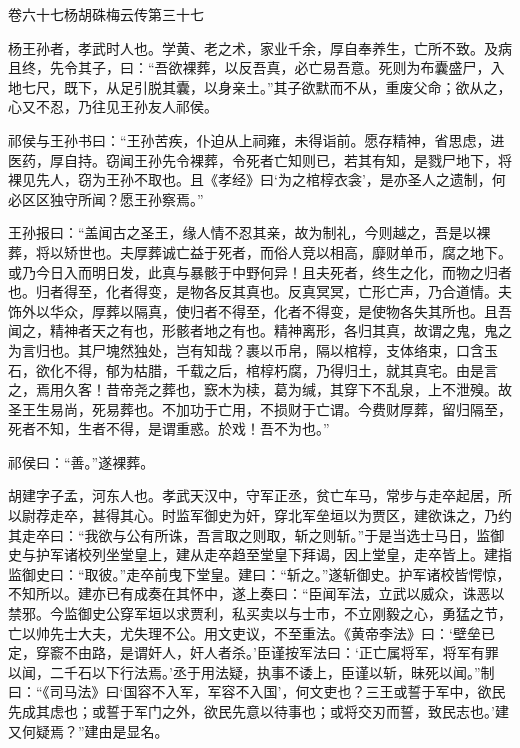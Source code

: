 \documentclass[12pt,UTF8]{ctexbook}
\begin{document}
卷六十七杨胡硃梅云传第三十七



杨王孙者，孝武时人也。学黄、老之术，家业千余，厚自奉养生，亡所不致。及病且终，先令其子，曰：“吾欲裸葬，以反吾真，必亡易吾意。死则为布囊盛尸，入地七尺，既下，从足引脱其囊，以身亲土。”其子欲默而不从，重废父命；欲从之，心又不忍，乃往见王孙友人祁侯。



祁侯与王孙书曰：“王孙苦疾，仆迫从上祠雍，未得诣前。愿存精神，省思虑，进医药，厚自持。窃闻王孙先令裸葬，令死者亡知则已，若其有知，是戮尸地下，将裸见先人，窃为王孙不取也。且《孝经》曰‘为之棺椁衣衾’，是亦圣人之遗制，何必区区独守所闻？愿王孙察焉。”



王孙报曰：“盖闻古之圣王，缘人情不忍其亲，故为制礼，今则越之，吾是以裸葬，将以矫世也。夫厚葬诚亡益于死者，而俗人竞以相高，靡财单币，腐之地下。或乃今日入而明日发，此真与暴骸于中野何异！且夫死者，终生之化，而物之归者也。归者得至，化者得变，是物各反其真也。反真冥冥，亡形亡声，乃合道情。夫饰外以华众，厚葬以隔真，使归者不得至，化者不得变，是使物各失其所也。且吾闻之，精神者天之有也，形骸者地之有也。精神离形，各归其真，故谓之鬼，鬼之为言归也。其尸塊然独处，岂有知哉？裹以币帛，隔以棺椁，支体络束，口含玉石，欲化不得，郁为枯腊，千载之后，棺椁朽腐，乃得归土，就其真宅。由是言之，焉用久客！昔帝尧之葬也，窾木为椟，葛为缄，其穿下不乱泉，上不泄殠。故圣王生易尚，死易葬也。不加功于亡用，不损财于亡谓。今费财厚葬，留归隔至，死者不知，生者不得，是谓重惑。於戏！吾不为也。”



祁侯曰：“善。”遂裸葬。



胡建字子孟，河东人也。孝武天汉中，守军正丞，贫亡车马，常步与走卒起居，所以尉荐走卒，甚得其心。时监军御史为奸，穿北军垒垣以为贾区，建欲诛之，乃约其走卒曰：“我欲与公有所诛，吾言取之则取，斩之则斩。”于是当选士马日，监御史与护军诸校列坐堂皇上，建从走卒趋至堂皇下拜谒，因上堂皇，走卒皆上。建指监御史曰：“取彼。”走卒前曳下堂皇。建曰：“斩之。”遂斩御史。护军诸校皆愕惊，不知所以。建亦已有成奏在其怀中，遂上奏曰：“臣闻军法，立武以威众，诛恶以禁邪。今监御史公穿军垣以求贾利，私买卖以与士市，不立刚毅之心，勇猛之节，亡以帅先士大夫，尤失理不公。用文吏议，不至重法。《黄帝李法》曰：‘壁垒已定，穿窬不由路，是谓奸人，奸人者杀。’臣谨按军法曰：‘正亡属将军，将军有罪以闻，二千石以下行法焉。’丞于用法疑，执事不诿上，臣谨以斩，昧死以闻。”制曰：“《司马法》曰‘国容不入军，军容不入国’，何文吏也？三王或誓于军中，欲民先成其虑也；或誓于军门之外，欲民先意以待事也；或将交刃而誓，致民志也。’建又何疑焉？”建由是显名。
\end{document}
